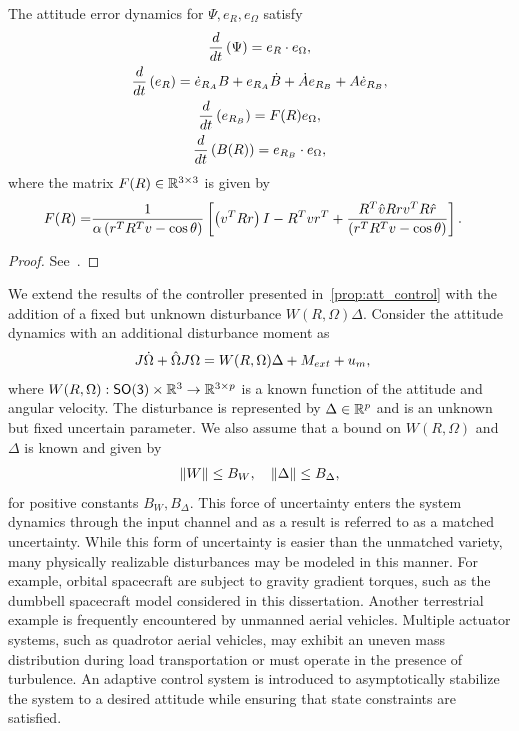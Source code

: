 \begin{prop}\label{prop:repulsive_error_dynamics}
	The attitude error dynamics for \( \Psi, e_R, e_\Omega \) satisfy 
	\begin{gather}
		\frac{d }{d t} \left( \Psi \right) = e_R \cdot e_\Omega , \label{eq:psi_dot}\\
		\frac{d }{d t} \left( e_R \right) = \dot{e}_{R_A} B + e_{R_A} \dot{B} + \dot{A}e_{R_B} + A \dot{e}_{R_B} , \label{eq:eR_dot} \\
		\frac{d }{d t} \left( e_{R_B} \right) = F(R) e_\Omega , \label{eq:eRB_dot} \\
		\frac{d }{d t} \left( B(R) \right) = e_{R_B} \cdot e_\Omega , \label{eq:B_dot}
	\end{gather}
	where the matrix \(F(R) \in \mathbb{R}^{3\times3} \) is given by
	\begin{align}
		F(R) = &\frac{1}{\alpha \left( r^T R^T v - \cos \theta \right)} \left[\left( v^T R r \right) I - R^T v r^T + \frac{R^T \hat{v} R r v^T R \hat{r}}{\left( r^T R^T v - \cos \theta \right)}\right]. \label{eq:F}
	\end{align}
\end{prop}
\begin{proof}
    See~.
\end{proof}

We extend the results of the controller presented in~\cref{prop:att_control} with the addition of a fixed but unknown disturbance \( W(R, \Omega) \Delta \).
Consider the attitude dynamics with an additional disturbance moment as
\begin{align}
    J \dot{\Omega} + \hat{\Omega} J \Omega &= W(R, \Omega)\Delta  +  M_{ext} + u_m,\label{eq:Wdot}
\end{align}
where \( W(R, \Omega) : \mathsf{SO(3)} \times \mathbb{R}^3 \to \mathbb{R}^{3 \times p } \) is a known function of the attitude and angular velocity.
The disturbance is represented by \( \Delta \in \mathbb{R}^p \) and is an unknown but fixed uncertain parameter.
We also assume that a bound on \( W(R, \Omega) \) and \( \Delta \) is known and given by
\begin{align}\label{eq:disturbance_bounds}
    \left\| W \right\| \leq B_W, \quad \left\| \Delta \right\| \leq B_\Delta,
\end{align}
for positive constants \(B_W, B_\Delta\).
This force of uncertainty enters the system dynamics through the input channel and as a result is referred to as a matched uncertainty.
While this form of uncertainty is easier than the unmatched variety, many physically realizable disturbances may be modeled in this manner.
For example, orbital spacecraft are subject to gravity gradient torques, such as the dumbbell spacecraft model considered in this dissertation.
Another terrestrial example is frequently encountered by unmanned aerial vehicles.
Multiple actuator systems, such as quadrotor aerial vehicles, may exhibit an uneven mass distribution during load transportation or must operate in the presence of turbulence.
An adaptive control system is introduced to asymptotically stabilize the system to a desired attitude while ensuring that state constraints are satisfied. %

